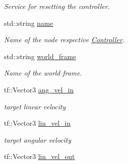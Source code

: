 \begin{DoxyCompactItemize}
\begin{DoxyCompactList}\small\item\em Service for resetting the controller. \end{DoxyCompactList}\item 
std\+::string \hyperlink{classController_af81f22d8b64d915769acfb8e8d89e0c8}{name}\hypertarget{classController_af81f22d8b64d915769acfb8e8d89e0c8}{}\label{classController_af81f22d8b64d915769acfb8e8d89e0c8}

\begin{DoxyCompactList}\small\item\em Name of the node respective \hyperlink{classController}{Controller}. \end{DoxyCompactList}\item 
std\+::string \hyperlink{classController_ae01171e69d9b735e44964662275fc77c}{world\+\_\+frame}\hypertarget{classController_ae01171e69d9b735e44964662275fc77c}{}\label{classController_ae01171e69d9b735e44964662275fc77c}

\begin{DoxyCompactList}\small\item\em Name of the world frame. \end{DoxyCompactList}\item 
tf\+::\+Vector3 \hyperlink{classController_a538a49aa6e62ee89de241874b7f26625}{ang\+\_\+vel\+\_\+in}\hypertarget{classController_a538a49aa6e62ee89de241874b7f26625}{}\label{classController_a538a49aa6e62ee89de241874b7f26625}

\begin{DoxyCompactList}\small\item\em target linear velocity \end{DoxyCompactList}\item 
tf\+::\+Vector3 \hyperlink{classController_ab94918bba11d4526cd5dc20e64655845}{lin\+\_\+vel\+\_\+in}\hypertarget{classController_ab94918bba11d4526cd5dc20e64655845}{}\label{classController_ab94918bba11d4526cd5dc20e64655845}

\begin{DoxyCompactList}\small\item\em target angular velocity \end{DoxyCompactList}\item 
tf\+::\+Vector3 \hyperlink{classController_ac7b5300b4fc0b2436d4a17d4bb60b078}{lin\+\_\+vel\+\_\+out}\hypertarget{classController_ac7b5300b4fc0b2436d4a17d4bb60b078}{}\label{classController_ac7b5300b4fc0b2436d4a17d4bb60b078}


\end{DoxyCompactItemize}
